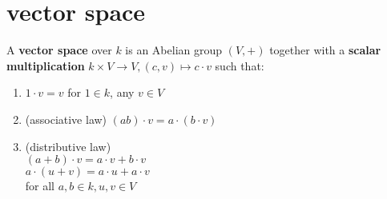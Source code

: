 \section{vector space}
\begin{definition}
    A \textbf{vector space} over  $ k  $ is an Abelian group  $ (V,+) $ together with a \textbf{scalar multiplication}  $ k\times V \rightarrow V,(c,v)\mapsto c\cdot v  $ such that:
    \begin{enumerate}[$ (1) $]
        \item  $ 1\cdot v =v  $ for  $ 1\in k  $, any  $ v\in V  $ 
        \item (associative law)  $ (ab)\cdot v =a\cdot (b\cdot v) $  
        \item (distributive law) \\$ (a+b)\cdot v =a\cdot v+b\cdot v $ \\ $ a\cdot (u+v) =a\cdot u+a\cdot v$\\for all  $ a,b\in k,u,v\in V $  
    \end{enumerate} 
\end{definition}